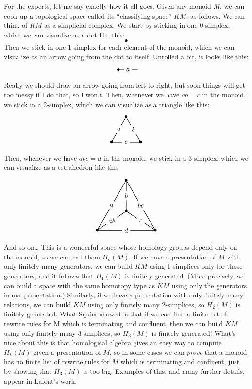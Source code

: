 \documentclass{article}
\begin{document}
For the experts, let me say exactly how it all goes. Given any monoid
\(M\), we can cook up a topological space called its ``classifying
space'' \(KM\), as follows. We can think of \(KM\) as a simplicial
complex. We start by sticking in one 0-simplex, which we can visualize
as a dot like this: \[\bullet\] Then we stick in one 1-simplex for each
element of the monoid, which we can visualize as an arrow going from the
dot to itself. Unrolled a bit, it looks like this: \[
  \begin{tikzpicture}
    \draw[thick] (0,0) node{$\bullet$} to node[fill=white]{$a$} (1,0);
  \end{tikzpicture}
\] Really we should draw an arrow going from left to right, but soon
things will get too messy if I do that, so I won't. Then, whenever we
have \(ab = c\) in the monoid, we stick in a 2-simplex, which we can
visualize as a triangle like this: \[
  \begin{tikzpicture}
    \draw[thick] (0,0) node{$\bullet$} to node[fill=white]{$c$} (1.5,0) node{$\bullet$} to node[fill=white]{$b$} (0.75,1.3) node{$\bullet$} to node[fill=white]{$a$} cycle;
  \end{tikzpicture}
\] Then, whenever we have \(abc = d\) in the monoid, we stick in a
3-simplex, which we can visualize as a tetrahedron like this \[
  \begin{tikzpicture}
    \draw[thick] (0,0) node{$\bullet$} to node[fill=white]{$d$} (3,0) node{$\bullet$} to node[fill=white]{$bc$} (1.5,2.6) node{$\bullet$} to node[fill=white]{$a$} cycle;
    \draw[thick] (0,0) to node[fill=white]{$ab$} (1.5,1) node{$\bullet$};
    \draw[thick] (1.5,2.6) to node[fill=white]{$b$} (1.5,1);
    \draw[thick] (3,0) to node[fill=white]{$c$} (1.5,1);
  \end{tikzpicture}
\] And so on\ldots{} This is a wonderful space whose homology groups
depend only on the monoid, so we can call them \(H_k(M)\). If we have a
presentation of \(M\) with only finitely many generators, we can build
\(KM\) using 1-simplices only for those generators, and it follows that
\(H_1(M)\) is finitely generated. (More precisely, we can build a space
with the same homotopy type as \(KM\) using only the generators in our
presentation.) Similarly, if we have a presentation with only finitely
many relations, we can build \(KM\) using only finitely many
2-simplices, so \(H_2(M)\) is finitely generated. What Squier showed is
that if we can find a finite list of rewrite rules for M which is
terminating and confluent, then we can build \(KM\) using only finitely
many 3-simplices, so \(H_3(M)\) is finitely generated! What's nice about
this is that homological algebra gives an easy way to compute \(H_k(M)\)
given a presentation of \(M\), so in some cases we can \emph{prove} that
a monoid has no finite list of rewrite rules for \(M\) which is
terminating and confluent, just by showing that \(H_3(M)\) is too big.
Examples of this, and many further details, appear in Lafont's work:
\end{document}

